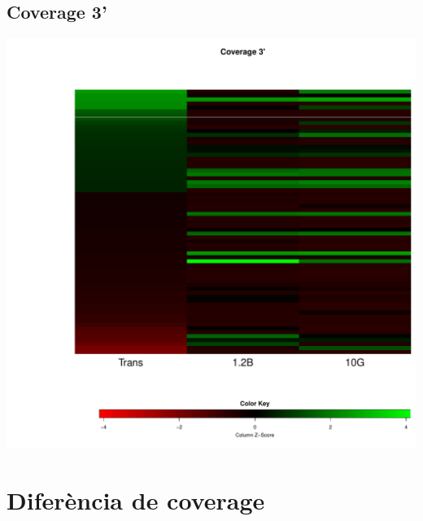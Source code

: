 \documentclass{article}\usepackage[]{graphicx}\usepackage[]{color}
\newenvironment{knitrout}{}{} %
\begin{document}
\subsection{Coverage 3'}
\begin{knitrout}
\color{fgcolor}

{\centering \includegraphics[width=.9\linewidth]{figure/minimal-heat_cov_tts-1} 

}



\end{knitrout}
\clearpage

\section{Diferència de coverage}
\end{document}
